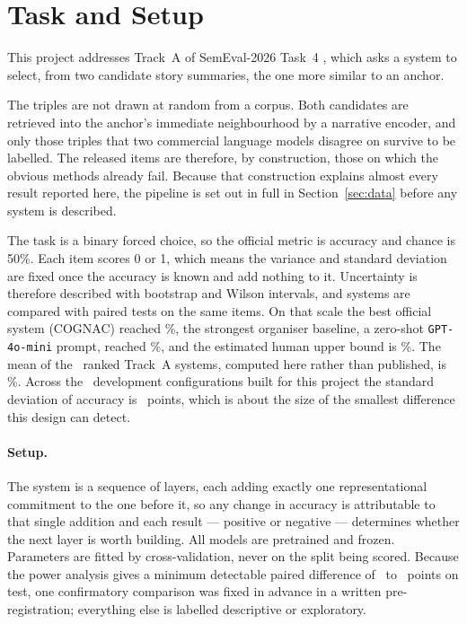 \documentclass[11pt,letterpaper,twocolumn]{article}
\begin{document}

\section{Task and Setup}\label{sec:task}
This project addresses Track~A of SemEval-2026 Task~4 \citep{hatzel2026}, which
asks a system to select, from two candidate story summaries, the one more
similar to an anchor.

The triples are not drawn at random from a corpus. Both candidates are
retrieved into the anchor's immediate neighbourhood by a narrative encoder, and
only those triples that two commercial language models disagree on survive to
be labelled. The released items are therefore, by construction, those on which
the obvious methods already fail. Because that construction explains almost
every result reported here, the pipeline is set out in full in
Section~\ref{sec:data} before any system is described.

The task is a binary forced choice, so the official metric is accuracy and
chance is 50\%.  %
Each item scores 0 or 1, which means the variance and standard deviation are
fixed once the accuracy is known and add nothing to it. Uncertainty is
therefore described with bootstrap and Wilson intervals, and systems are
compared with paired tests on the same items. On that scale the best official
system (COGNAC) reached \OfficialBestA\%, the strongest organiser baseline, a
zero-shot \texttt{GPT-4o-mini} prompt, reached \OfficialBaselineA\%, and the
estimated human upper bound is \HumanBound\%. The mean of the
\OfficialRankedA\ ranked Track~A systems, computed here rather than published,
is \OfficialMeanA\%. Across the \RunCountDev\ development configurations built
for this project the standard deviation of accuracy is \SpreadDevSD\ points,
which is about the size of the smallest difference this design can detect.

\paragraph{Setup.} The system is a sequence of layers, each adding exactly one
representational commitment to the one before it, so any change in accuracy is
attributable to that single addition and each result --- positive or negative
--- determines whether the next layer is worth building. All models are
pretrained and frozen. Parameters are fitted by cross-validation, never on the
split being scored. Because the power analysis gives a minimum detectable paired
difference of \PowerPairedLo\ to \PowerPairedHi\ points on test, one
confirmatory comparison was fixed in advance in a written pre-registration; everything else is
labelled descriptive or exploratory.
\end{document}
